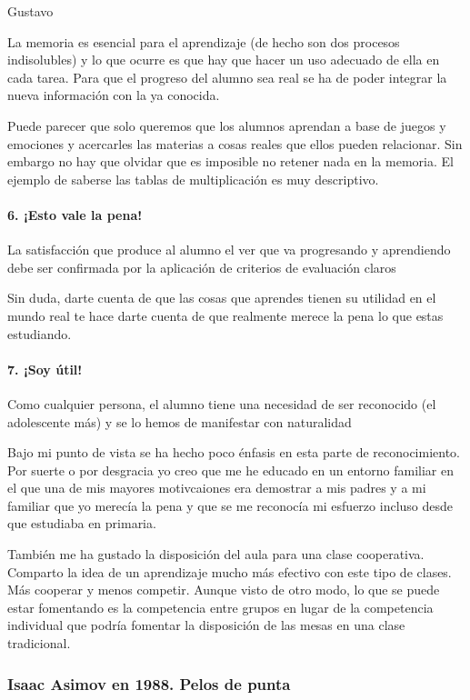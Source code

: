 \begin{opin}{\guscolor}{Gustavo}
\begin{leftbar}{\guscolor}
La memoria es esencial para el aprendizaje (de hecho son dos procesos indisolubles) y lo que ocurre es que hay que hacer un uso adecuado de ella en cada tarea. Para que el progreso del alumno sea real se ha de poder integrar la nueva información con la ya conocida.

Puede parecer que solo queremos que los alumnos aprendan a base de juegos y emociones y acercarles las materias a cosas reales que ellos pueden relacionar. Sin embargo no hay que olvidar que es imposible no retener nada en la memoria. El ejemplo de saberse las tablas de multiplicación es muy descriptivo.

\paragraph{6. ¡Esto vale la pena!}

La satisfacción que produce al alumno el ver que va progresando y aprendiendo debe ser confirmada por la aplicación de criterios de evaluación claros

Sin duda, darte cuenta de que las cosas que aprendes tienen su utilidad en el mundo real te hace darte cuenta de que realmente merece la pena lo que estas estudiando.

\paragraph{7. ¡Soy útil!}

Como cualquier persona, el alumno tiene una necesidad de ser reconocido (el adolescente más) y se lo hemos de manifestar con naturalidad

Bajo mi punto de vista se ha hecho poco énfasis en esta parte de reconocimiento. Por suerte o por desgracia yo creo que me he educado en un entorno familiar en el que una de mis mayores motivcaiones era demostrar a mis padres y a mi familiar que yo merecía la pena y que se me reconocía mi esfuerzo incluso desde que estudiaba en primaria. 

También me ha gustado la disposición del aula para una clase cooperativa. Comparto la idea de un aprendizaje mucho más efectivo con este tipo de clases. Más cooperar y menos competir. Aunque visto de otro modo, lo que se puede estar fomentando es la competencia entre grupos en lugar de la competencia individual que podría fomentar la disposición de las mesas en una clase tradicional.


\subsubsection{Isaac Asimov en 1988. Pelos de punta}


\end{leftbar}
\end{opin}
